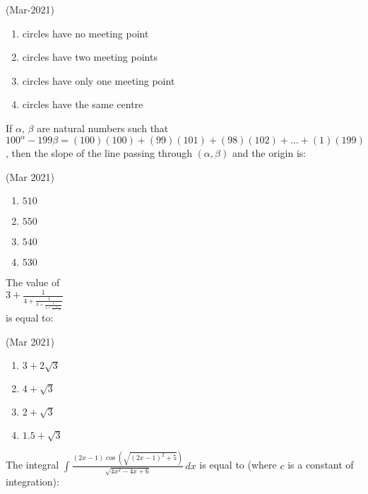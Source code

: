 	\hfill{(Mar-2021)}
	\begin{multicols}{2}
                \begin{enumerate}
    \item circles have no meeting point
    \item circles have two meeting points
    \item circles have only one meeting point
    \item circles have the same centre
                \end{enumerate}
	\end{multicols}
	\item
                If $\alpha$, $\beta$ are natural numbers such that $100^{\alpha} - 199\beta = (100)(100) + (99)(101) + (98)(102) + \ldots + (1)(199)$, then the slope of the line passing through $(\alpha ,\beta)$ and the origin is:

			\hfill{(Mar 2021)}
			\begin{multicols}{4}
                \begin{enumerate}
    \item $ 510 $
    \item $ 550 $
    \item $ 540 $
    \item $ 530 $
                \end{enumerate}
			\end{multicols}
	\item
		The value of \\
		$ 3 + \frac{1}{4 + \frac{1}{3 + \frac{1}{4 + \frac{1}{3 + \ldots \infty}}}} $  \\
		is equal to:

			\hfill{(Mar 2021)}
			\begin{multicols}{2}
		\begin{enumerate}
    \item $ 3 + 2\sqrt{3} $
    \item $ 4 + \sqrt{3} $
    \item $ 2 + \sqrt{3} $
    \item $ 1.5 + \sqrt{3} $
                \end{enumerate}
			\end{multicols}
	\item
		The integral $
\int \frac{(2x - 1) \cos\left(\sqrt{(2x - 1)^2 + 5}\right)}{\sqrt{4x^2 - 4x + 6}} \, dx $ is equal to (where \( c \) is a constant of integration):

